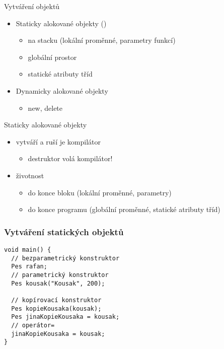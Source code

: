 
\begin{frame}[fragile]
\begin{block}{Vytváření objektů}
\begin{itemize}
\item Staticky alokované objekty ()
\begin{itemize}
\item na stacku (lokální proměnné, parametry funkcí)
\item globální prostor
\item statické atributy tříd

\end{itemize}
\item Dynamicky alokované objekty
\begin{itemize}
\item new, delete
\end{itemize}

\end{itemize}
\end{block}
\end{frame}


\begin{frame}
\begin{block}{Staticky alokované objekty}
\begin{itemize}
\item vytváří a ruší je kompilátor
\begin{itemize}
\item destruktor volá kompilátor!
\end{itemize}
\item životnost 
\begin{itemize}
\item do konce bloku (lokální proměnné, parametry)
\item do konce programu (globální proměnné, statické atributy tříd)
\end{itemize}
\end{itemize}
\end{block}
\end{frame}


\begin{frame}[fragile]
\frametitle{Vytváření statických objektů}

\begin{yesblock}
\begin{lstlisting}
void main() {
  // bezparametrický konstruktor
  Pes rafan;
  // parametrický konstruktor
  Pes kousak("Kousak", 200);

  // kopírovací konstruktor
  Pes kopieKousaka(kousak);
  Pes jinaKopieKousaka = kousak;
  // operátor=
  jinaKopieKousaka = kousak;
}
\end{lstlisting}
\end{yesblock}
\end{frame}


